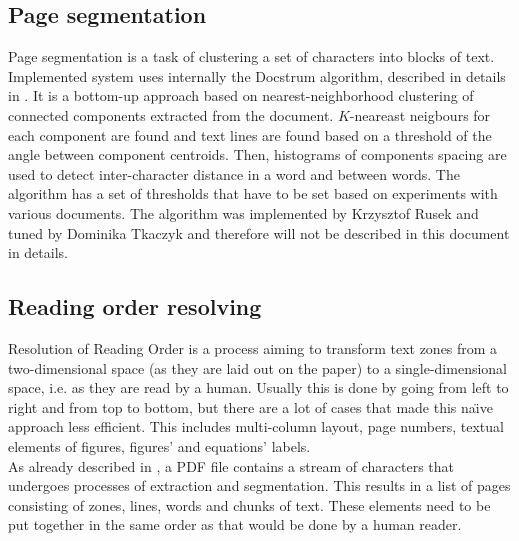 \subsection{Page segmentation}\label{sec:page_segmentation}
Page segmentation is a task of clustering a set of characters into blocks of text. Implemented system uses internally the Docstrum algorithm, described in details in \cite{O'Gorman1993}. It is a bottom-up approach based on nearest-neighborhood clustering of connected components extracted from the document. $K$-neareast neigbours for each component are found and text lines are found based on a threshold of the angle between component centroids. Then, histograms of components spacing are used to detect inter-character distance in a word and between words. The algorithm has a set of thresholds that have to be set based on experiments with various documents. The algorithm was implemented by Krzysztof Rusek and tuned by Dominika Tkaczyk and therefore will not be described in this document in details.

\subsection{Reading order resolving}\label{sec:reading_order}
Resolution of Reading Order is a process aiming to transform text zones from a two-dimensional space (as they are laid out on the paper) to a single-dimensional space, i.e. as they are read by a human. Usually this is done by going from left to right and from top to bottom, but there are a lot of cases that made this na\"\i ve approach less efficient. This includes multi-column layout, page numbers, textual elements of figures, figures' and equations' labels.\\

As already described in \cite{DominikaTkaczykPaweSzostekMateuszFedoryszakPiotrJanDendek2014}, a PDF file contains a stream of characters that undergoes processes of extraction and segmentation. This results in a list of pages consisting of zones, lines, words and chunks of text. These elements need to be put together in the same order as that would be done by a human reader.\\


